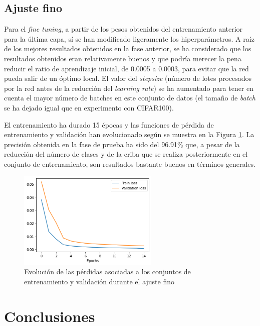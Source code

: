 \documentclass[10pt,a4paper]{article}
\begin{document}
\subsection{Ajuste fino}

Para el \textit{fine tuning}, a partir de los pesos obtenidos del entrenamiento anterior para la última capa, sí se han modificado ligeramente los hiperparámetros. A raíz de los mejores resultados obtenidos en la fase anterior, se ha considerado que los resultados obtenidos eran relativamente buenos y que podría merecer la pena reducir el ratio de aprendizaje inicial, de 0.0005 a 0.0003, para evitar que la red pueda salir de un óptimo local. El valor del \textit{stepsize} (número de lotes procesados por la red antes de la reducción del \textit{learning rate}) se ha aumentado para tener en cuenta el mayor número de batches en este conjunto de datos (el tamaño de \textit{batch} se ha dejado igual que en experimento con CIFAR100). 

El entrenamiento ha durado 15 épocas y las funciones de pérdida de entrenamiento y validación han evolucionado según se muestra en la Figura \ref{fig:loss_fruits_ft}. La precisión obtenida en la fase de prueba ha sido del 96.91\% que, a pesar de la reducción del número de clases y de la criba que se realiza posteriormente en el conjunto de entrenamiento, son resultados bastante buenos en términos generales.

\begin{figure}[h]
	\centering
	\includegraphics[width=0.6\textwidth]{loss_fruits_ft}
	\caption{Evolución de las pérdidas asociadas a los conjuntos de entrenamiento y validación durante el ajuste fino}
	\label{fig:loss_fruits_ft}
\end{figure}








\newpage
\section{Conclusiones}
\end{document}
